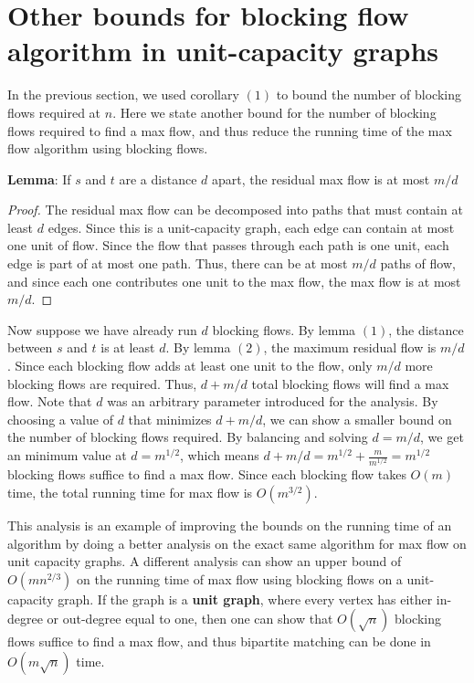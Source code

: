 \documentclass{article}
\begin{document}
\section {Other bounds for blocking flow algorithm in unit-capacity graphs}

In the previous section, we used corollary $(1)$ to bound the number of
blocking flows required at $n$. Here we state another bound for the 
number of blocking flows required to find a max flow, and thus reduce the
running time of the max flow algorithm using blocking flows.

\textbf{Lemma}:
  If $s$ and $t$ are a distance $d$ apart, the residual max 
flow is at most $m/d$

{\begin{proof}{ The residual max flow
can be decomposed into paths that must contain at least $d$ edges. 
Since this is a unit-capacity graph, each edge can contain at most
one unit of flow.  Since the flow that passes through each path is one unit,
each edge is part of at most one path.  Thus, there can be at most $m/d$
paths of flow, and since each one contributes one unit to the max flow, the
max flow is at most $m/d$.}
\end{proof}}

Now suppose we have already run $d$ blocking flows.  By
lemma $(1)$, the distance between $s$ and $t$ is at least $d$.  
By lemma $(2)$, the maximum residual flow is $m/d$.  Since each 
blocking flow adds at least one unit to the flow, only $m/d$ more
blocking flows are required.  Thus, $d+m/d$ total blocking flows
will find a max flow.  Note that $d$ was an arbitrary parameter introduced
for the analysis.  By choosing a value of $d$ that minimizes $d+m/d$, we
can show a smaller bound on the number of blocking flows required.
By balancing and solving $d=m/d$, we get an minimum value at
$d=m^{1/2}$, which means $d+m/d=m^{1/2} + \frac{m}{m^{1/2}} = m^{1/2}$
blocking flows suffice to find a max flow.  Since each blocking flow takes 
$O(m)$ time, the total running time for max flow is $O(m^{3/2})$.

This analysis is an example of improving the bounds on the running time of
an algorithm by doing a better analysis on the exact same algorithm for max flow
on unit capacity graphs.  A different analysis can show an upper bound of 
$O(m{n^{2/3}})$ on the running time of max flow using blocking flows on a
unit-capacity graph.  If the graph is a {\bf{unit graph}}, where every vertex has either
in-degree or out-degree equal to one, then one can show that $O(\sqrt{n})$ blocking
flows suffice to find a max flow, and thus bipartite matching can be done in $O(m \sqrt{n})$
time.
\end{document}

